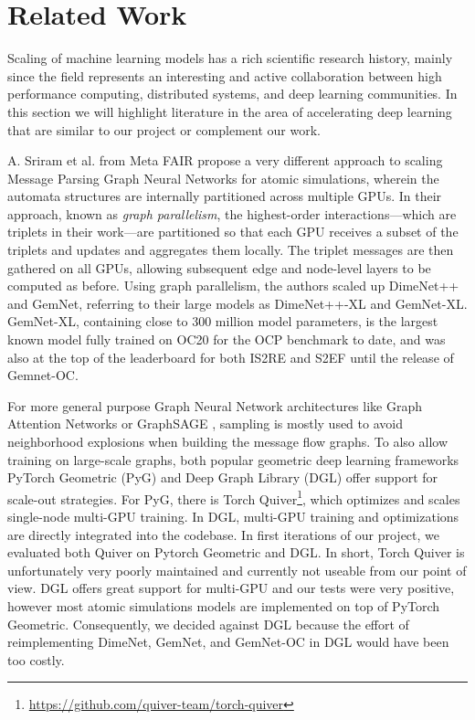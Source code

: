 \section{Related Work}
\label{section:related_work}

Scaling of machine learning models has a rich scientific research history, mainly since the field 
represents an interesting and active collaboration between high performance computing, distributed 
systems, and deep learning communities. In this section we will highlight literature in the area 
of accelerating deep learning that are similar to our project or complement our work.

A. Sriram et al. \cite*{https://doi.org/10.48550/arxiv.2203.09697} from Meta FAIR propose a very 
different approach to scaling Message Parsing Graph Neural Networks for atomic simulations, wherein 
the automata structures are internally partitioned across multiple GPUs. In their approach, known 
as \textit{graph parallelism}, the highest-order 
interactions---which are triplets in their work---are partitioned so that 
each GPU receives a subset of the triplets and updates and aggregates them locally. The 
triplet messages are then gathered on all GPUs, allowing subsequent edge and node-level layers 
to be computed as before. Using graph parallelism, the authors scaled up DimeNet++ and GemNet, 
referring to their large models as DimeNet++-XL and GemNet-XL. GemNet-XL, containing close to 300 
million model parameters, is the largest known model fully trained on OC20 for the OCP benchmark 
to date, and was also at the top of the leaderboard for both IS2RE and S2EF until the release of 
Gemnet-OC. 

For more general purpose Graph Neural Network architectures like Graph Attention Networks 
\cite*{10.48550/ARXIV.1710.10903} or GraphSAGE \cite*{10.48550/ARXIV.1706.02216}, sampling 
is mostly used to avoid neighborhood explosions when building the message flow graphs. To also 
allow training on large-scale graphs, both popular geometric deep learning frameworks PyTorch 
Geometric (PyG) \cite*{10.48550/ARXIV.1903.02428} and Deep Graph Library (DGL) 
\cite*{10.48550/ARXIV.1909.01315} offer support for scale-out strategies. For PyG, there is 
Torch Quiver\footnote{\url{https://github.com/quiver-team/torch-quiver}}, which optimizes and 
scales single-node multi-GPU training. In DGL, multi-GPU training and optimizations are directly 
integrated into the codebase. In first iterations of our project, we evaluated both Quiver 
on Pytorch Geometric and DGL. In short, Torch Quiver is unfortunately very poorly maintained 
and currently not useable from our point of view. DGL offers great support for multi-GPU and 
our tests were very positive, however most atomic simulations models are implemented on top 
of PyTorch Geometric. Consequently, we decided against DGL because the effort of reimplementing 
DimeNet, GemNet, and GemNet-OC in DGL would have been too costly. 

